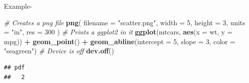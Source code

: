 \documentclass[
]{book}
\newenvironment{Shaded}{\begin{snugshade}}{\end{snugshade}}
\newcommand{\AttributeTok}[1]{\textcolor[rgb]{0.13,0.29,0.53}{#1}}
\newcommand{\CommentTok}[1]{\textcolor[rgb]{0.56,0.35,0.01}{\textit{#1}}}
\newcommand{\DecValTok}[1]{\textcolor[rgb]{0.00,0.00,0.81}{#1}}
\newcommand{\FunctionTok}[1]{\textcolor[rgb]{0.13,0.29,0.53}{\textbf{#1}}}
\newcommand{\NormalTok}[1]{#1}
\newcommand{\SpecialCharTok}[1]{\textcolor[rgb]{0.81,0.36,0.00}{\textbf{#1}}}
\newcommand{\StringTok}[1]{\textcolor[rgb]{0.31,0.60,0.02}{#1}}
\begin{document}
Example-

\begin{Shaded}
\begin{Highlighting}[]
\CommentTok{\# Creates a png file}
\FunctionTok{png}\NormalTok{(}
  \AttributeTok{filename =} \StringTok{"scatter.png"}\NormalTok{,}
  \AttributeTok{width =} \DecValTok{5}\NormalTok{,}
  \AttributeTok{height =} \DecValTok{3}\NormalTok{,}
  \AttributeTok{units =} \StringTok{"in"}\NormalTok{,}
  \AttributeTok{res =} \DecValTok{300}
\NormalTok{)}
\CommentTok{\# Prints a ggplot2 in it}
\FunctionTok{ggplot}\NormalTok{(mtcars, }\FunctionTok{aes}\NormalTok{(}\AttributeTok{x =}\NormalTok{ wt, }\AttributeTok{y =}\NormalTok{ mpg)) }\SpecialCharTok{+}
  \FunctionTok{geom\_point}\NormalTok{() }\SpecialCharTok{+}
  \FunctionTok{geom\_abline}\NormalTok{(}\AttributeTok{intercept =} \DecValTok{5}\NormalTok{,}
              \AttributeTok{slope =} \DecValTok{3}\NormalTok{,}
              \AttributeTok{color =} \StringTok{"seagreen"}\NormalTok{)}
\CommentTok{\# Device is off}
\FunctionTok{dev.off}\NormalTok{()}
\end{Highlighting}
\end{Shaded}

\begin{verbatim}
## pdf 
##   2
\end{verbatim}

\begin{Shaded}
\end{Shaded}
\end{document}
